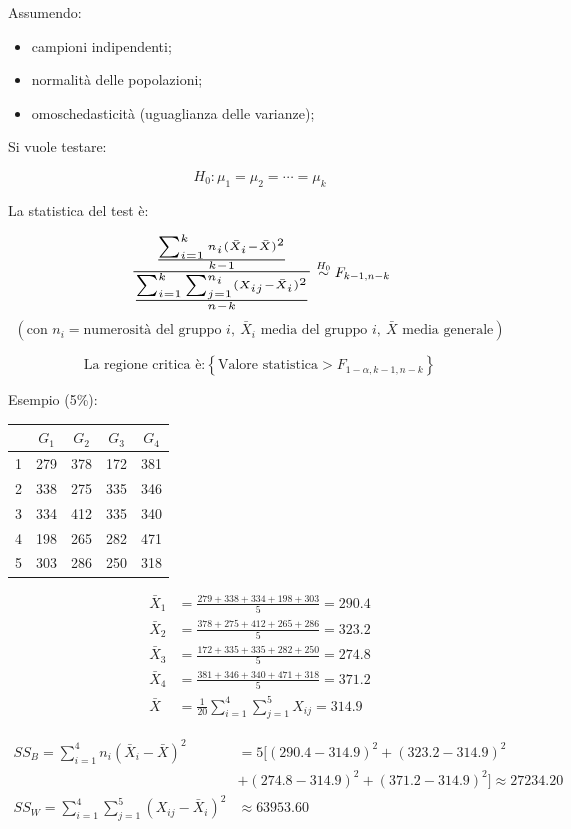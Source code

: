 \documentclass{article}
\begin{document}
Assumendo:
\begin{itemize}
    \item campioni indipendenti;
    \item normalità delle popolazioni;
    \item omoschedasticità (uguaglianza delle varianze);\newline
\end{itemize}

Si vuole testare:

\[
H_0:\mu_1=\mu_2=\cdots=\mu_k
\]

La statistica del test è:

$$
\scalebox{1.5}{$
\frac{
\frac{\sum_{i=1}^{k} n_i(\bar X_i-\bar X)^2}{k-1}
}{
\frac{\sum_{i=1}^{k}\sum_{j=1}^{n_i}(X_{ij}-\bar X_i)^2}{n-k}
}
$}
\overset{H_0}{\sim}
F_{k-1,n-k}
$$
$$
(\text{con }n_i=\text{numerosità del gruppo }i, \ \bar X_i\text{ media del gruppo }i, \ \bar X\text{ media generale})
$$

\[
\text{La regione critica è:}
\left\{
\text{Valore statistica}>
F_{1-\alpha,k-1,n-k}
\right\}
\]\newline

Esempio (5\%):

\begin{table}[ht]
    \centering
    \begin{tabular}{c|cccc}
     & $G_1$ & $G_2$ & $G_3$ & $G_4$ \\
    \hline
    1&279&378&172&381\\
    2&338&275&335&346\\
    3&334&412&335&340\\
    4&198&265&282&471\\
    5&303&286&250&318
    \end{tabular}
\end{table}

\[
\begin{aligned}
\bar X_1&=\frac{279+338+334+198+303}{5}=290.4\\
\bar X_2&=\frac{378+275+412+265+286}{5}=323.2\\
\bar X_3&=\frac{172+335+335+282+250}{5}=274.8\\
\bar X_4&=\frac{381+346+340+471+318}{5}=371.2\\
\bar X&=
\frac{1}{20}
\sum_{i=1}^{4}\sum_{j=1}^{5}X_{ij}
=314.9
\end{aligned}
\]

\[
\begin{aligned}
SS_B=
\sum_{i=1}^{4}n_i(\bar X_i-\bar X)^2&=
5[(290.4-314.9)^2+(323.2-314.9)^2\\ &+(274.8-314.9)^2+(371.2-314.9)^2]
\approx27234.20\\
SS_W
=
\sum_{i=1}^{4}
\sum_{j=1}^{5}
(X_{ij}-\bar X_i)^2&\approx63953.60
\end{aligned}
\]
\end{document}
